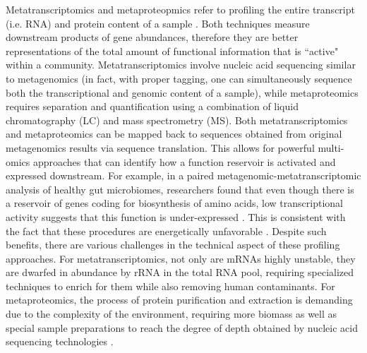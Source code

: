 Metatranscriptomics and metaproteopmics refer to profiling the entire transcript (i.e. RNA) and protein content of a sample \cite{franzosa2015sequencing}. Both techniques measure downstream products of gene abundances, therefore they are better representations of the total amount of functional information that is ``active" within a community. Metatranscriptomics involve nucleic acid sequencing similar to metagenomics (in fact, with proper tagging, one can simultaneously sequence both the transcriptional and genomic content of a sample), while metaproteomics requires separation and quantification using a combination of liquid chromatography (LC) and mass spectrometry (MS). Both metatranscriptomics and metaproteomics can be mapped back to sequences obtained from original metagenomics results via sequence translation. This allows for powerful multi-omics approaches that can identify how a function reservoir is activated and expressed downstream. For example, in a paired metagenomic-metatranscriptomic analysis of healthy gut microbiomes, researchers found that even though there is a reservoir of genes coding for biosynthesis of amino acids, low transcriptional activity suggests that this function is under-expressed \cite{franzosa2014relating}. This is consistent with the fact that these procedures are energetically unfavorable \cite{oliphant2019macronutrient}. Despite such benefits, there are various challenges in the technical aspect of these profiling approaches. For metatranscriptomics, not only are mRNAs highly unstable, they are dwarfed in abundance by rRNA in the total RNA pool, requiring specialized techniques to enrich for them while also removing human contaminants. For metaproteomics, the process of protein purification and extraction is demanding due to the complexity of the environment, requiring more biomass as well as special sample preparations to reach the degree of depth obtained by nucleic acid sequencing technologies \cite{leary2013which, schiebenhoefer2019challenges, verberkmoes2009shotgun}. 

